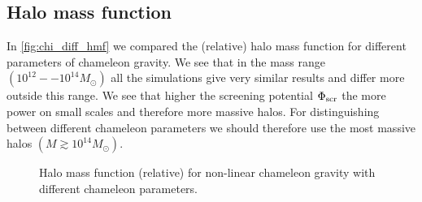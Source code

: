 \subsection{Halo mass function}
In \autoref{fig:chi_diff_hmf} we compared the (relative) halo mass function for different parameters of chameleon gravity. We see that in the mass range $(10^{12}--10^{14}M_\odot)$ all the simulations give very similar results and differ more outside this range. We see that higher the screening potential $\Phi_{\text{\scriptsize scr}}$ the more power on small scales and therefore more massive halos. For distinguishing between different chameleon parameters we should therefore use the most massive halos $(M\gtrsim10^{14}M_\odot)$.
\begin{figure*}
	\centering
		\chileft
		\begin{subfigure}{1.2\textwidth}
		\end{subfigure}
		\begin{subfigure}{1.0\textwidth}
			\centering
		\end{subfigure}
		\caption{Halo mass function (relative) for non-linear chameleon gravity with different chameleon parameters.}
		\label{fig:chi_diff_hmf}
	\end{figure*}